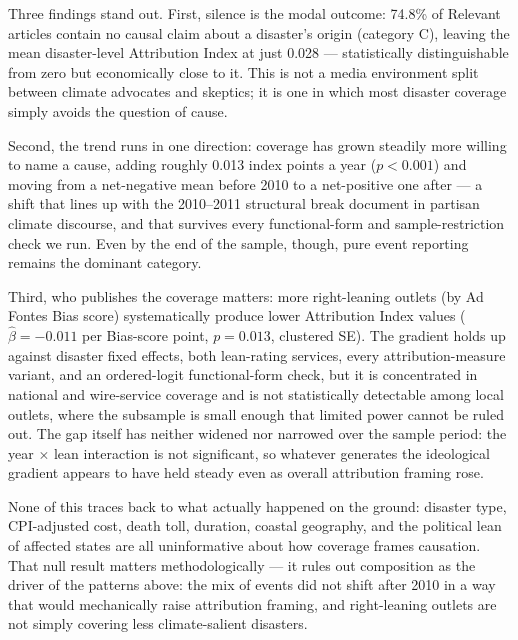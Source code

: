 \documentclass[12pt]{article}
\begin{document}
Three findings stand out.  First, silence is the modal outcome: 74.8\%
of Relevant articles contain no causal claim about a disaster's origin
(category C), leaving the mean disaster-level Attribution Index at just
0.028 --- statistically distinguishable from zero but economically
close to it.  This is not a media environment split between climate
advocates and skeptics; it is one in which most disaster coverage
simply avoids the question of cause.

Second, the trend runs in one direction: coverage has grown steadily
more willing to name a cause, adding roughly 0.013 index points a year
($p < 0.001$) and moving from a net-negative mean before 2010 to a
net-positive one after --- a shift that lines up with the 2010--2011
structural break \citet{chinn2020} document in partisan climate
discourse, and that survives every functional-form and
sample-restriction check we run.  Even by the end of the sample, though,
pure event reporting remains the dominant category.

Third, who publishes the coverage matters: more right-leaning outlets
(by Ad Fontes Bias score) systematically produce lower Attribution
Index values ($\hat\beta = -0.011$ per Bias-score point, $p = 0.013$,
clustered SE).  The gradient holds up against disaster fixed effects,
both lean-rating services, every attribution-measure variant, and an
ordered-logit functional-form check, but it is concentrated in national
and wire-service coverage and is not statistically detectable among
local outlets, where the subsample is small enough that limited power
cannot be ruled out.  The gap itself has neither widened nor narrowed
over the sample period: the year $\times$ lean interaction is not
significant, so whatever generates the ideological gradient appears to
have held steady even as overall attribution framing rose.

None of this traces back to what actually happened on the ground:
disaster type, CPI-adjusted cost, death toll, duration, coastal
geography, and the political lean of affected states are all
uninformative about how coverage frames causation.  That null result
matters methodologically --- it rules out composition as the driver of
the patterns above: the mix of events did not shift after 2010 in a way
that would mechanically raise attribution framing, and right-leaning
outlets are not simply covering less climate-salient disasters.
\end{document}
